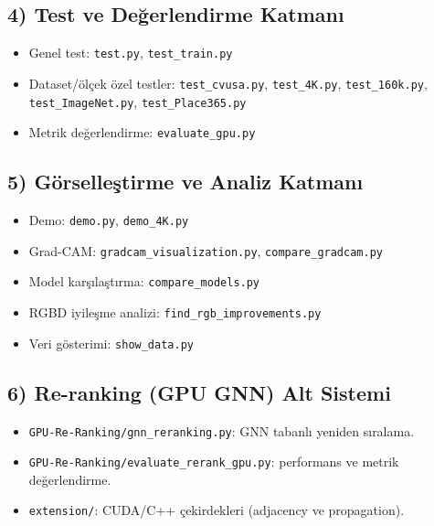 \documentclass[11pt,a4paper]{article}
\begin{document}
\subsection{4) Test ve Değerlendirme Katmanı}
\begin{itemize}
    \item Genel test: \texttt{test.py}, \texttt{test\_train.py}
    \item Dataset/ölçek özel testler: \texttt{test\_cvusa.py}, \texttt{test\_4K.py}, \texttt{test\_160k.py}, \texttt{test\_ImageNet.py}, \texttt{test\_Place365.py}
    \item Metrik değerlendirme: \texttt{evaluate\_gpu.py}
\end{itemize}

\subsection{5) Görselleştirme ve Analiz Katmanı}
\begin{itemize}
    \item Demo: \texttt{demo.py}, \texttt{demo\_4K.py}
    \item Grad-CAM: \texttt{gradcam\_visualization.py}, \texttt{compare\_gradcam.py}
    \item Model karşılaştırma: \texttt{compare\_models.py}
    \item RGBD iyileşme analizi: \texttt{find\_rgb\_improvements.py}
    \item Veri gösterimi: \texttt{show\_data.py}
\end{itemize}

\subsection{6) Re-ranking (GPU GNN) Alt Sistemi}
\begin{itemize}
    \item \texttt{GPU-Re-Ranking/gnn\_reranking.py}: GNN tabanlı yeniden sıralama.
    \item \texttt{GPU-Re-Ranking/evaluate\_rerank\_gpu.py}: performans ve metrik değerlendirme.
    \item \texttt{extension/}: CUDA/C++ çekirdekleri (adjacency ve propagation).
\end{itemize}
\end{document}
